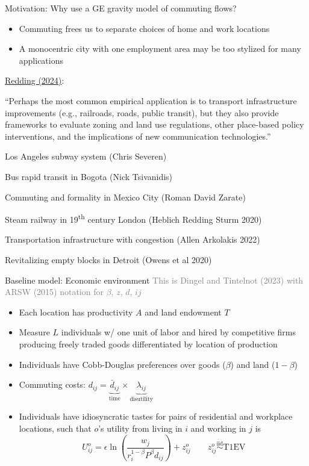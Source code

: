 \documentclass[11pt,notes=hide,aspectratio=169]{beamer}
\begin{document}
\begin{frame}{Motivation: Why use a GE gravity model of commuting flows?}
\begin{itemize}
\item Commuting frees us to separate choices of home and work locations
\item A monocentric city with one employment area may be too stylized for many applications
\end{itemize}
\href{https://www.nber.org/papers/w33130}{Redding (2024)}:
{``Perhaps the most common empirical application is to transport infrastructure improvements (e.g., railroads, roads, public transit), but they also provide frameworks to evaluate zoning and land use regulations, other place-based policy interventions, and the implications of new communication technologies.''\par}
\begin{itemize}{\small
\item Los Angeles subway system (Chris Severen)
\item Bus rapid transit in Bogota (Nick Tsivanidis)
\item Commuting and formality in Mexico City (Roman David Zarate)
\item Steam railway in 19\textsuperscript{th} century London (Heblich Redding Sturm 2020)
\item Transportation infrastructure with congestion (Allen Arkolakis 2022)
\item Revitalizing empty blocks in Detroit (Owens et al 2020)
}\end{itemize}
\end{frame}
\begin{frame}{Baseline model: Economic environment}
\textcolor{gray}{This is Dingel and Tintelnot (2023) with ARSW (2015) notation for $\beta$, $z$, $d$, $ij$}
\begin{itemize}
\item
Each location has productivity $A$ and land endowment $T$
\item 
Measure $L$ individuals w/ one unit of labor
and hired by 
competitive firms producing freely traded goods differentiated by location of production
\item
Individuals have Cobb-Douglas preferences over goods ($\beta$) and land ($1-\beta$) 
\item
Commuting costs: $d_{ij} = \underbrace{\bar{d}_{ij}}_{\text{time}} \times \underbrace{\lambda_{ij}}_{\text{disutility}}$
\item
Individuals have idiosyncratic tastes for pairs of residential and workplace locations,
such that
$o$'s utility from living in $i$ and working in $j$ is
\begin{equation*}
U_{ij}^{o} = \epsilon \ln\left(\frac{w_j}{r_i^{1-\beta} P^\beta d_{ij}}\right) + z_{ij}^{o}
\qquad
z_{ij}^{o} \stackrel{\text{iid}}{\sim} \text{T1EV}
\end{equation*}
\end{itemize}
\end{frame}
\end{document}
